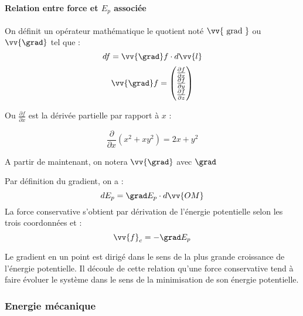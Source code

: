\paragraph{Relation entre force et \(E_{p}\) associée}

\begin{definition}[Gradient]
    On définit un opérateur mathématique le quotient noté \(\vv{\text{ grad } } \) ou \(\vv{\grad }\) tel que : 
    \[
        df = \vv{\grad }f \cdot d\vv{l}
    \]   
    \[
        \vv{\grad }f = \begin{pmatrix}
            \frac{\partial f}{\partial x } \\
            \frac{\partial f}{\partial y }\\
            \frac{\partial f}{\partial z}  \\
        \end{pmatrix}
    \]
    \begin{notation}
        Ou \(\frac{\partial f}{\partial x}\) est la dérivée partielle par rapport à \(x\) : 
        \begin{eg}[Exemple]
            \[
                \frac{\partial }{\partial x} \left( x^{2}+xy^{2}  \right) = 2x + y^{2}
            \]
        \end{eg}
    \end{notation}
\end{definition}

\begin{notation}
    A partir de maintenant, on notera \(\vv{\grad }\) avec \(\grad \)  
\end{notation}

\begin{corollary}
    Par définition du gradient, on a : 
    \[
        dE_{p} = \grad E_{p} \cdot d \vv{OM}
    \]
    La force conservative s'obtient par dérivation de l'énergie potentielle selon les trois coordonnées et : 
    \[
        \vv{f}_{c} = -\grad E_{p}
    \]
\end{corollary}

\begin{corollary}
    Le gradient en un point est dirigé dans le sens de la plus grande croissance de l'énergie potentielle. Il découle de cette relation qu'une force conservative tend à faire évoluer le système dans le sens de la minimisation de son énergie potentielle. 
\end{corollary}

\subsubsection{Energie mécanique}

